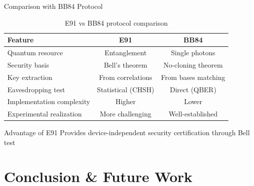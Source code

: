\documentclass[10pt]{beamer}
\begin{document}
\begin{frame}{Comparison with BB84 Protocol}
    \begin{table}[h]
        \centering
        \begin{tabular}{lcc}
            \toprule
            \textbf{Feature} & \textbf{E91} & \textbf{BB84} \\
            \midrule
            Quantum resource & Entanglement & Single photons \\
            Security basis & Bell's theorem & No-cloning theorem \\
            Key extraction & From correlations & From bases matching \\
            Eavesdropping test & Statistical (CHSH) & Direct (QBER) \\
            Implementation complexity & Higher & Lower \\
            Experimental realization & More challenging & Well-established \\
            \bottomrule
        \end{tabular}
        \caption{E91 vs BB84 protocol comparison}
    \end{table}
    
    \vspace{3mm}
    \begin{block}{Advantage of E91}
        Provides device-independent security certification through Bell test
    \end{block}
\end{frame}

\section{Conclusion \& Future Work}
\end{document}
